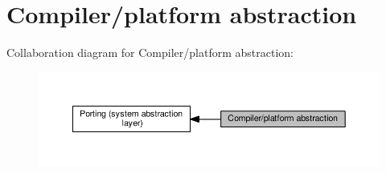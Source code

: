 \hypertarget{group__compiler__abstraction}{}\section{Compiler/platform abstraction}
\label{group__compiler__abstraction}
Collaboration diagram for Compiler/platform abstraction\+:
\nopagebreak
\begin{figure}[H]
\begin{center}
\leavevmode
\includegraphics[width=350pt]{group__compiler__abstraction}
\end{center}
\end{figure}

